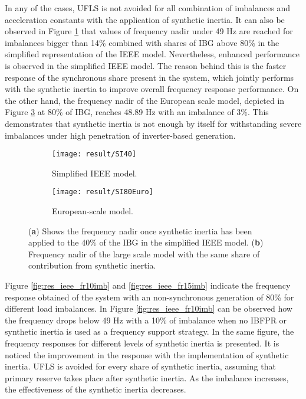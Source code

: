 In any of the cases, UFLS is not avoided for all combination of imbalances and acceleration constants with the application of synthetic inertia. It can also be observed in Figure \ref{fig:res_nadirieee_si} that values of frequency nadir under 49 Hz are reached for imbalances bigger than 14\% combined with shares of IBG above 80\% in the simplified representation of the IEEE model. Nevertheless, enhanced performance is observed in the simplified IEEE model. The reason behind this is the faster response of the synchronous share present in the system, which jointly performs with the synthetic inertia to improve overall frequency response performance. On the other hand, the frequency nadir of the European scale model, depicted in Figure \ref{fig:res_nadireuro_si} at 80\% of IBG, reaches 48.89 Hz with an imbalance of 3\%. This demonstrates that synthetic inertia is not enough by itself for withstanding severe imbalances under high penetration of inverter-based generation.\\
\begin{figure}[h]
	\centering
	\begin{subfigure}[h]{0.49\textwidth}
		\centering
		\texttt{[image: result/SI40]}
		\caption{Simplified IEEE model.}
		\label{fig:res_nadirieee_si}
	\end{subfigure}
	\hfill
	\begin{subfigure}[h]{0.49\textwidth}
		\centering
		\texttt{[image: result/SI80Euro]}
		\caption{European-scale model.}
		\label{fig:res_nadireuro_si}
	\end{subfigure}
	
	
	\caption{(\textbf{a}) Shows the frequency nadir once synthetic inertia has been applied to the 40\% of the IBG in the simplified IEEE model. (\textbf{b}) Frequency nadir of the large scale model with the same share of contribution from synthetic inertia.}
\end{figure}


Figure \ref{fig:res_ieee_fr10imb} and \ref{fig:res_ieee_fr15imb} indicate the frequency response obtained of the system with an non-synchronous generation of 80\% for different load imbalances.  In Figure \ref{fig:res_ieee_fr10imb} can be observed how the frequency drops below 49 Hz with a 10\% of imbalance when no IBFPR or synthetic inertia is used as a frequency support strategy. In the same figure, the frequency responses for different levels of synthetic inertia is presented. It is noticed the improvement in the response with the implementation of synthetic inertia. UFLS is avoided for every share of synthetic inertia, assuming that primary reserve takes place after synthetic inertia. As the imbalance increases, the effectiveness of the synthetic inertia decreases. 

